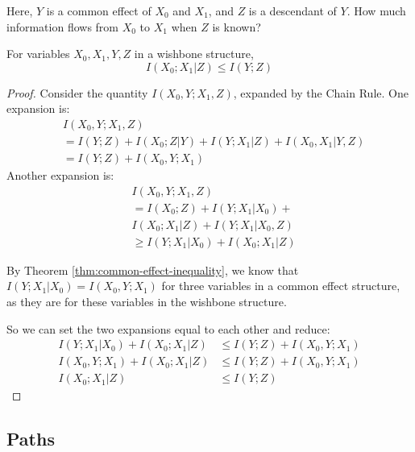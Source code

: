 \documentclass[../thesis.tex]{subfiles}
\begin{document}
Here, $Y$ is a common effect of $X_0$ and $X_1$,
and $Z$ is a descendant of $Y$.
How much information flows from $X_0$ to $X_1$
when $Z$ is known?

\begin{thm}
  \label{thm:wishbone}
  For variables $X_0, X_1, Y, Z$ in a wishbone structure,
  $$I(X_0;X_1 \vert Z) \leq I(Y;Z)$$
\end{thm}
\begin{proof}
  Consider the quantity $I(X_0, Y; X_1, Z)$,
  expanded by the Chain Rule.
  One expansion is:
  \begin{equation}
    \begin{split}
      & I(X_0, Y; X_1, Z) \\
      & = I(Y;Z) + I(X_0;Z \vert Y) + I(Y; X_1 \vert Z) + I(X_0, X_1 \vert Y,Z) \\
      & = I(Y;Z) + I(X_0,Y;X_1)
    \end{split}
  \end{equation}
  Another expansion is:
  \begin{equation}
    \begin{split}
      & I(X_0, Y; X_1, Z) \\
      & = I(X_0;Z) + I(Y;X_1 \vert X_0) + \\
      & I(X_0; X_1 \vert Z) + I(Y; X_1 \vert X_0,Z) \\
      & \geq I(Y; X_1 \vert X_0) + I(X_0; X_1 \vert Z) 
    \end{split}
  \end{equation}

  By Theorem \ref{thm:common-effect-inequality},
  we know that $I(Y;X_1 \vert X_0) = I(X_0,Y;X_1)$
  for three variables in a common effect structure,
  as they are for these variables in the wishbone structure.

  So we can set the two expansions equal to each other and reduce:
  \begin{equation}
    \begin{split}
      I(Y; X_1 \vert X_0) + I(X_0; X_1 \vert Z) & \leq I(Y;Z) + I(X_0,Y;X_1) \\
      I(X_0, Y; X_1) + I(X_0; X_1 \vert Z) & \leq I(Y;Z) + I(X_0,Y;X_1) \\
      I(X_0; X_1 \vert Z) & \leq I(Y;Z)
    \end{split}
  \end{equation}
\end{proof}
\subsection{Paths}
\end{document}
